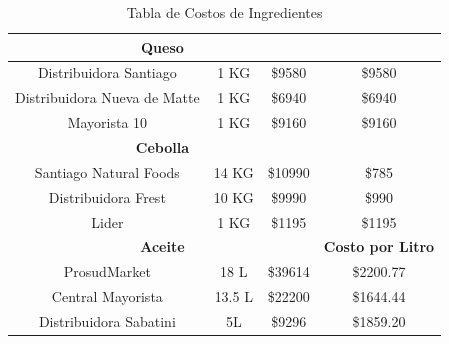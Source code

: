 \documentclass[12pt]{article}
\begin{document}
\begin{table}[h!]
\begin{tabular}{|| c | c | c | c||}
        \multicolumn{3}{||c|}{\textbf{Queso}} & \\ [0.5ex] \hline \hline %
        Distribuidora Santiago & 1 KG & \$9580 & \$9580 \\ \hline
        Distribuidora Nueva de Matte & 1 KG & \$6940 & \$6940 \\ \hline
        Mayorista 10 & 1 KG & \$9160 & \$9160 \\ [1ex] \hline \hline

        \multicolumn{3}{||c|}{\textbf{Cebolla}} & \\ [0.5ex] \hline \hline %
        Santiago Natural Foods & 14 KG & \$10990 & \$785 \\ \hline
        Distribuidora Frest & 10 KG & \$9990 & \$990 \\ \hline
        Lider & 1 KG & \$1195 & \$1195 \\ [1ex] \hline \hline

        \multicolumn{3}{||c|}{\textbf{Aceite}} & \textbf{Costo por Litro} \\ [0.5ex] \hline \hline
        ProsudMarket & 18 L & \$39614 & \$2200.77 \\ \hline
        Central Mayorista & 13.5 L & \$22200 & \$1644.44 \\ \hline
        Distribuidora Sabatini & 5L & \$9296 & \$1859.20 \\ [1ex] \hline \hline

    \end{tabular}
    \caption{Tabla de Costos de Ingredientes}
    \label{tab:costos_ingredientes}
\end{table}
\end{document}
